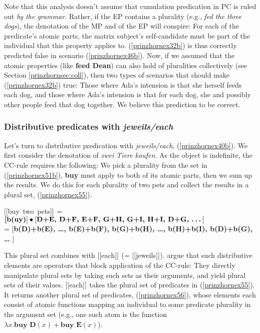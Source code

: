 \documentclass[output=paper,colorlinks,citecolor=brown,
]{langscibook}
\newcommand{\sem}[2]{\mbox{$[\![${#2}$]\!]^{#1}$}} %
\begin{document}
Note that this analysis doesn't assume that cumulation predication in PC is ruled out \textit{by the grammar}. Rather, if the EP contains a plurality (e.g., \textit{fed the three dogs}), the denotation of the MP and of the EP will conspire: For each of the predicate's atomic parts,  the matrix subject's self-candidate must be part of the individual that this property applies to. (\ref{prinzhornex32b}) is thus correctly predicted false in scenario (\ref{prinzhornex46b}). Now, if we assumed that the atomic properties (like \textbf{feed Dean}) can also hold of pluralities collectively (see Section \ref{prinzhornsec:coll}), then  two types of scenarios that should make (\ref{prinzhornex32b}) true: Those where Ada's intension is that she herself feeds each dog, and those where Ada's intension is that for each dog, she and possibly other people feed that dog together. We believe this prediction to be correct.








\subsubsection{Distributive predicates with \textit{jeweils/each}}\label{prinzhornsec:dist}  Let's turn to distributive predication with \textit{jeweils/each}, (\ref{prinzhornex40b}). We first consider the denotation of \textit{zwei Tiere kaufen}. As the object is indefinite, the CC-rule requires the following: We pick a plurality from the set in (\ref{prinzhornex51b}),  \textbf{buy} must apply to both of its atomic parts, then we sum up the results. We do this for each plurality of two pets and collect the results in a plural set, (\ref{prinzhornex55}).

\ea \sem{}{buy two pets} = $\textbf[\textbf{b(uy)}] \bullet [ \textbf{D+E, D+F, E+F, G+H, G+I, H+I, D+G,  \dots} ]$\\ = 
$[$\textbf{b(D)+b(E), \dots, b(E)+b(F), b(G)+b(H), \dots, b(H)+b(I), b(D)+b(G), \dots} $]$\label{prinzhornex55} \z

This plural set combines with \sem{}{each} (= \sem{}{jeweils}). \cite{Haslinger:2018b} argue that such distributive elements are operators that block application of the CC-rule: They directly manipulate plural sets by  taking such sets as their arguments, and  yield plural sets of their values. \sem{}{each} takes the plural set of predicates in (\ref{prinzhornex55}). It returns another plural set of predicates, (\ref{prinzhornex56}), whose elements each consist of atomic functions  mapping an individual to some predicate plurality in the argument set (e.g., one such atom is the function $\lambda x.\textbf{buy D}(x)+\textbf{buy E}(x)$).
\end{document}
